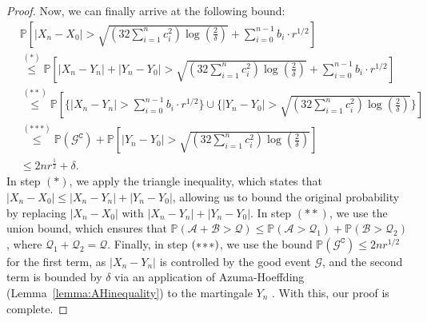 \documentclass{article}
\newcommand{\mc}{\mathcal}
\begin{document}
\begin{proof}
Now, we can finally arrive at the following bound:
    \begin{equation}
        \begin{aligned}
            &\mathbb{P}\left[ |X_n - X_0| > \sqrt{\left(32\sum_{i=1}^{n} c_i^2\right)\log\left(\frac{2}{\delta}\right)} + \sum_{i=0}^{n-1} b_i \cdot r^{1/2} \right] \\
            & \overset{(*)}{\leq} \mathbb{P}\left[ |X_n - Y_n|+|Y_n - Y_0| > \sqrt{\left(32\sum_{i=1}^{n} c_i^2\right)\log\left(\frac{2}{\delta}\right)} + \sum_{i=0}^{n-1} b_i \cdot r^{1/2} \right] \\
            &  \overset{(**)}{\leq} \mathbb{P}\left[ \Bigg\{|X_n - Y_n| > \sum_{i=0}^{n-1} b_i \cdot r^{1/2} \Bigg\} \cup \Bigg\{|Y_n - Y_0| > \sqrt{\left(32\sum_{i=1}^{n} c_i^2\right)\log\left(\frac{2}{\delta}\right)}\Bigg\} \right] \\
            &\overset{(***)}{\leq} \mathbb{P}(\mathcal{G}^{\texttt{C}}) + \mathbb{P}\left[ |Y_n - Y_0| > \sqrt{\left(32\sum_{i=1}^{n} c_i^2\right)\log\left(\frac{2}{\delta}\right)} \right] \\
            &\leq 2n r^{\frac{1}{2}} + \delta.
        \end{aligned}
    \end{equation}
   In step \((*)\), we apply the triangle inequality, which states that \(|X_n - X_0| \leq |X_n - Y_n| + |Y_n - Y_0|\), allowing us to bound the original probability by replacing \(|X_n - X_0|\) with \(|X_n - Y_n| + |Y_n - Y_0|\). In step \((**)\), we use the union bound, which ensures that \(\mathbb{P}(\mathcal{A} + \mc{B} > \mc{Q}) \leq \mathbb{P}(\mc{A} > \mc{Q}_1) + \mathbb{P}(\mc{B} > \mc{Q}_2)\), where \(\mc{Q}_1 + \mc{Q}_2 = \mc{Q}\). Finally, in step \((*\hspace{-0.5mm}*\hspace{-0.5mm}*)\), we use the bound \(\mathbb{P}(\mathcal{G}^{\texttt{C}}) \leq 2n r^{1/2}\) for the first term, as \(|X_n - Y_n|\) is controlled by the good event \(\mathcal{G}\), and the second term is bounded by \(\delta\) via an application of Azuma-Hoeffding (Lemma~\ref{lemma:AHinequality}) to the martingale \(Y_n\) .  With this, our proof is complete. 
   \end{proof}
\end{document}
